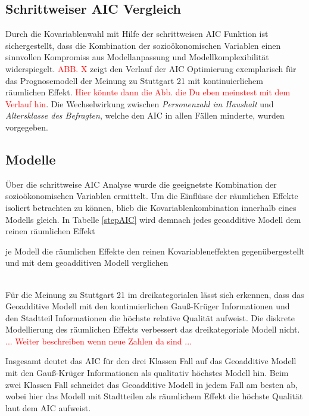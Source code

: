 \documentclass{Vorlage}
\begin{document}
\subsection{Schrittweiser AIC Vergleich}
Durch die Kovariablenwahl mit Hilfe der schrittweisen AIC Funktion ist sichergestellt, dass die Kombination der sozioökonomischen Variablen einen sinnvollen Kompromiss aus Modellanpassung und Modellkomplexibilität widerspiegelt. \textcolor{red}{ABB. X} zeigt den Verlauf der AIC Optimierung exemplarisch für das Prognosemodell der Meinung zu Stuttgart 21 mit kontinuierlichem räumlichen Effekt. \textcolor{red}{Hier könnte dann die Abb. die Du eben meinstest mit dem Verlauf hin}. Die Wechselwirkung zwischen \textit{Personenzahl im Haushalt} und \textit{Altersklasse des Befragten}, welche den AIC in allen Fällen minderte, wurden vorgegeben.

\subsection{Modelle}
Über die schrittweise AIC Analyse wurde die geeignetste Kombination der sozioökonomischen Variablen ermittelt. Um die Einflüsse der räumlichen Effekte isoliert betrachten zu können, blieb die Kovariablenkombination innerhalb eines Modells gleich. In Tabelle \ref{stepAIC} wird demnach jedes geoadditive Modell dem reinen räumlichen Effekt

 je Modell die räumlichen Effekte den reinen Kovariableneffekten gegenübergestellt und mit dem geoadditiven Modell verglichen

\\
Für die Meinung zu Stuttgart 21 im dreikategorialen lässt sich erkennen, dass das Geoadditive Modell mit den kontinuierlichen Gauß-Krüger Informationen und den Stadtteil Informationen die höchste relative Qualität aufweist. Die diskrete Modellierung des räumlichen Effekts verbessert das dreikategoriale Modell nicht. \textcolor{red}{... Weiter beschreiben wenn neue Zahlen da sind ...}


Insgesamt deutet das AIC für den drei Klassen Fall auf das Geoadditive Modell mit den Gauß-Krüger Informationen als qualitativ höchstes Modell hin. Beim zwei Klassen Fall schneidet das Geoadditive Modell in jedem Fall am besten ab, wobei hier das Modell mit Stadtteilen als räumlichem Effekt die höchste Qualität laut dem AIC aufweist.
\end{document}
